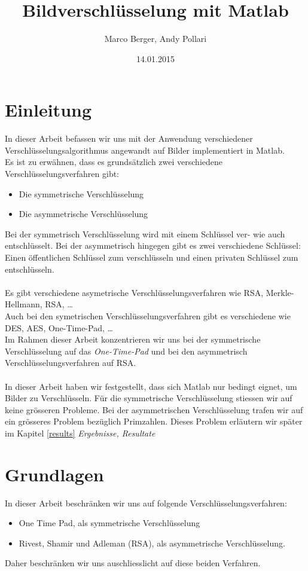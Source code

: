 \documentclass[paper=a4,fontsize=12pt]{scrartcl}
\begin{document}
\title{Bildverschlüsselung mit Matlab}
\author{Marco Berger, Andy Pollari}
\date{14.01.2015}
\maketitle 

\section{Einleitung}
In dieser Arbeit befassen wir uns mit der Anwendung verschiedener Verschlüsselungsalgorithmus
angewandt auf Bilder implementiert in Matlab. \\
Es ist zu erwähnen, dass es grundsätzlich zwei verschiedene Verschlüsselungsverfahren gibt:
\begin{itemize}
  \item Die symmetrische Verschlüsselung 
  \item Die asymmetrische Verschlüsselung 
\end{itemize}
Bei der symmetrisch Verschlüsselung wird mit einem Schlüssel ver- wie auch entschlüsselt.
Bei der asymmetrisch hingegen gibt es zwei verschiedene Schlüssel: Einen öffentlichen Schlüssel zum verschlüsseln
und einen privaten Schlüssel zum entschlüsseln. \\ \\
Es gibt verschiedene asymetrische Verschlüsselungsverfahren wie RSA, Merkle-Hellmann, RSA, \ldots \\
Auch bei den symetrischen Verschlüsselungsverfahren gibt es verschiedene wie DES, AES, One-Time-Pad, \ldots \\
Im Rahmen dieser Arbeit konzentrieren wir uns bei der symmetrische Verschlüsselung auf das \textit{One-Time-Pad} 
und bei den asymmetrisch Verschlüsselungsverfahren auf RSA. \\ \\
In dieser Arbeit haben wir festgestellt, dass sich Matlab nur bedingt eignet, um Bilder zu Verschlüsseln.
Für die symmetrische Verschlüsselung stiessen wir auf keine grösseren Probleme. Bei der asymmetrischen Verschlüsselung
trafen wir auf ein grösseres Problem bezüglich Primzahlen. Dieses Problem erläutern wir später im Kapitel \ref{results} \textit{Ergebnisse, Resultate}

\newpage 
\section{Grundlagen} 
In dieser Arbeit beschränken wir uns auf folgende Verschlüsselungsverfahren:
\begin{itemize}
  \item One Time Pad, als symmetrische Verschlüsselung
  \item Rivest, Shamir und Adleman (RSA), als asymmetrische Verschlüsselung.
\end{itemize} 
Daher beschränken wir uns auschliesslicht auf diese beiden Verfahren. 
\end{document}
